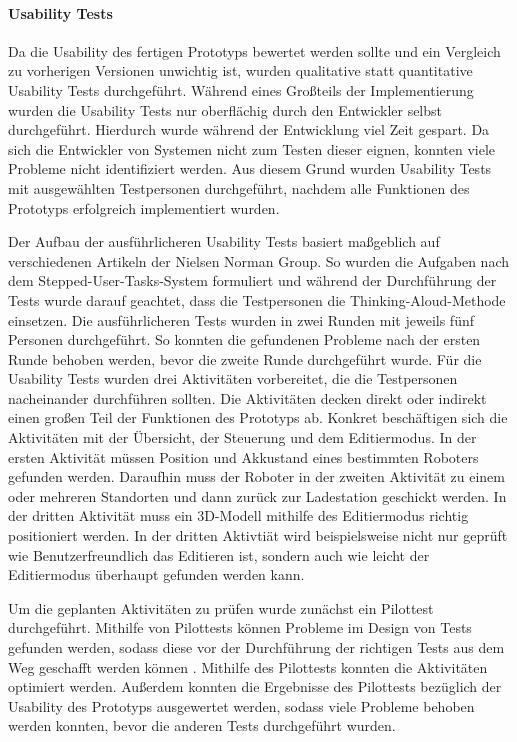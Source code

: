 \paragraph{Usability Tests}\label{sec:UsabilityTests}
Da die Usability des fertigen Prototyps bewertet werden sollte und ein Vergleich zu vorherigen Versionen unwichtig ist, wurden qualitative statt quantitative Usability Tests durchgeführt. Während eines Großteils der Implementierung wurden die Usability Tests nur oberflächig durch den Entwickler selbst durchgeführt. Hierdurch wurde während der Entwicklung viel Zeit gespart. Da sich die Entwickler von Systemen nicht zum Testen dieser eignen, konnten viele Probleme nicht identifiziert werden. Aus diesem Grund wurden Usability Tests mit ausgewählten Testpersonen durchgeführt, nachdem alle Funktionen des Prototyps erfolgreich implementiert wurden.

Der Aufbau der ausführlicheren Usability Tests basiert maßgeblich auf verschiedenen Artikeln der Nielsen Norman Group. So wurden die Aufgaben nach dem Stepped-User-Tasks-System \cite{Pernice.2020} formuliert und während der Durchführung der Tests wurde darauf geachtet, dass die Testpersonen die Thinking-Aloud-Methode \cite{Nielsen.2012b} einsetzen. Die ausführlicheren Tests wurden in zwei Runden mit jeweils fünf Personen durchgeführt. So konnten die gefundenen Probleme nach der ersten Runde behoben werden, bevor die zweite Runde durchgeführt wurde. Für die Usability Tests wurden drei Aktivitäten vorbereitet, die die Testpersonen nacheinander durchführen sollten. Die Aktivitäten decken direkt oder indirekt einen großen Teil der Funktionen des Prototyps ab. Konkret beschäftigen sich die Aktivitäten mit der Übersicht, der Steuerung und dem Editiermodus. In der ersten Aktivität müssen Position und Akkustand eines bestimmten Roboters gefunden werden. Daraufhin muss der Roboter in der zweiten Aktivität zu einem oder mehreren Standorten und dann zurück zur Ladestation geschickt werden. In der dritten Aktivität muss ein 3D-Modell mithilfe des Editiermodus richtig positioniert werden. In der dritten Aktivtiät wird beispielsweise nicht nur geprüft wie Benutzerfreundlich das Editieren ist, sondern auch wie leicht der Editiermodus überhaupt gefunden werden kann.

Um die geplanten Aktivitäten zu prüfen wurde zunächst ein Pilottest durchgeführt. Mithilfe von Pilottests können Probleme im Design von Tests gefunden werden, sodass diese vor der Durchführung der richtigen Tests aus dem Weg geschafft werden können \cite{Schade.2015}. Mithilfe des Pilottests konnten die Aktivitäten optimiert werden. Außerdem konnten die Ergebnisse des Pilottests bezüglich der Usability des Prototyps ausgewertet werden, sodass viele Probleme behoben werden konnten, bevor die anderen Tests durchgeführt wurden.

